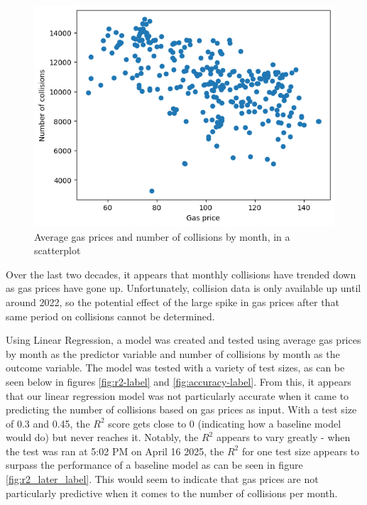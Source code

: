 \documentclass[runningheads]{llncs}
\begin{document}
\begin{figure}
    \centering
    \includegraphics[scale=0.75]{Scatter.png}   
    \caption{Average gas prices and number of collisions by month, in a scatterplot}
    \label{fig:scatter-label}
\end{figure}

Over the last two decades, it appears that monthly collisions have trended down as gas prices have gone up. Unfortunately, collision data is only available up until around 2022, so the potential effect of the large spike in gas prices after that same period on collisions cannot be determined.

Using Linear Regression, a model was created and tested using average gas prices by month as the predictor variable and number of collisions by month as the outcome variable. The model was tested with a variety of test sizes, as can be seen below in figures \ref{fig:r2-label} and \ref{fig:accuracy-label}. From this, it appears that our linear regression model was not particularly accurate when it came to predicting the number of collisions based on gas prices as input. With a test size of 0.3 and 0.45, the \(R^2\) score gets close to 0 (indicating how a baseline model would do) but never reaches it. Notably, the \(R^2\) appears to vary greatly - when the test was ran at 5:02 PM on April 16 2025, the \(R^2\) for one test size appears to surpass the performance of a baseline model as can be seen in figure \ref{fig:r2_later_label}. This would seem to indicate that gas prices are not particularly predictive when it comes to the number of collisions per month.
\end{document}
